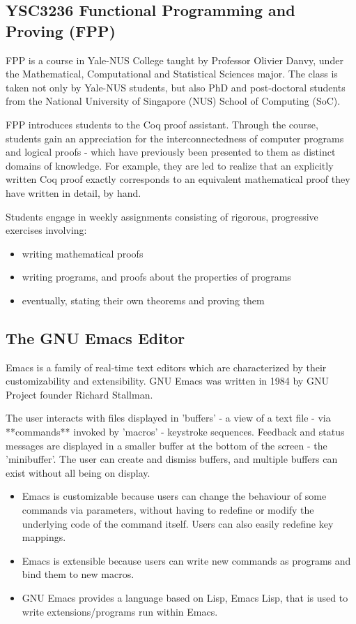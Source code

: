 \subsection{YSC3236 Functional Programming and Proving (FPP)}
FPP is a course in Yale-NUS College taught by Professor Olivier Danvy, under the Mathematical, Computational and Statistical Sciences major. The class is taken not only by Yale-NUS students, but also PhD and post-doctoral students from the National University of Singapore (NUS) School of Computing (SoC).

FPP introduces students to the Coq proof assistant. Through the course, students gain an appreciation for the interconnectedness of computer programs and logical proofs - which have previously been presented to them as distinct domains of knowledge. For example, they are led to realize that an explicitly written Coq proof exactly corresponds to an equivalent mathematical proof they have written in detail, by hand.

Students engage in weekly assignments consisting of rigorous, progressive exercises involving:
\begin{itemize}
    \item writing mathematical proofs
    \item  writing programs, and proofs about the properties of programs
    \item eventually, stating their own theorems and proving them
\end{itemize}

\subsection{The GNU Emacs Editor}

Emacs is a family of real-time text editors which are characterized by their customizability and extensibility. GNU Emacs was written in 1984 by GNU Project founder Richard Stallman.

The user interacts with files displayed in 'buffers' - a view of a text file - via **commands** invoked by 'macros' - keystroke sequences. Feedback and status messages are displayed in a smaller buffer at the bottom of the screen - the 'minibuffer'. The user can create and dismiss buffers, and multiple buffers can exist without all being on display.

\begin{itemize}
    \item Emacs is customizable because users can change the behaviour of some commands via parameters, without having to redefine or modify the underlying code of the command itself. Users can also easily redefine key mappings.
    \item Emacs is extensible because users can write new commands as programs and bind them to new macros.
    \item GNU Emacs provides a language based on Lisp, Emacs Lisp, that is used to write extensions/programs run within Emacs.
\end{itemize}

